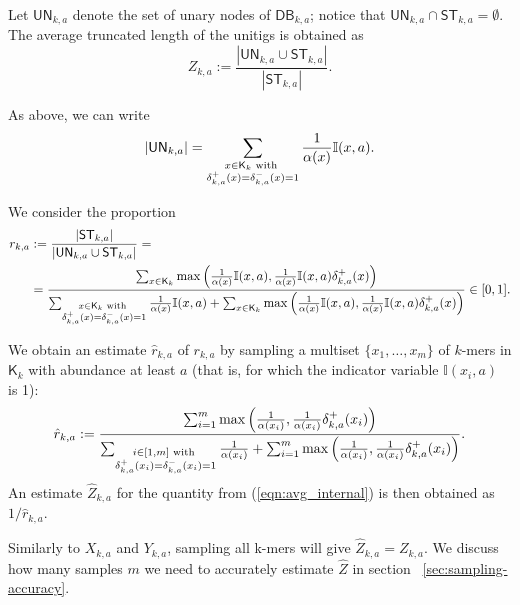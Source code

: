 \documentclass[a4paper,11pt]{article}
\newcommand{\alex}[1]{{\color{blue}{#1}}}
\newcommand{\DB}{\mathsf{DB}_{k,a}}
\newcommand{\ST}{\mathsf{ST}_{k,a}}
\newcommand{\UN}{\mathsf{UN}_{k,a}}
\newcommand{\dplus}{\delta^+_{k,a}}
\newcommand{\dminus}{\delta^-_{k,a}}
\newcommand{\K}{\mathsf{K}}
\newcommand{\abu}{\alpha}
\begin{document}
Let $\UN$ denote the set of unary nodes of $\DB$; notice that $\UN \cap \ST = \emptyset$. The average truncated length of the unitigs is obtained as 
\begin{equation}
 Z_{k,a} := \frac{|\UN \cup \ST|}{|\ST|}.
\label{eqn:avg_internal}
\end{equation}

As above, we can write
\[|\UN| = \sum_{\begin{subarray}{c} x \in \K_k \text{ with } \\ \dplus(x) = \dminus(x) = 1 \end{subarray}} \frac{1}{\abu(x)}\mathbb{I}(x,a).\]

We consider the proportion
\begin{align*}
r_{k,a} & := \frac{|\ST|}{|\UN \cup \ST|} = \\ 
& = \frac{\sum_{x \in \K_k} \max\left(\frac{1}{\abu(x)}\mathbb{I}(x,a),\frac{1}{\abu(x)}\mathbb{I}(x,a)\dplus(x)\right)}{\sum_{\begin{subarray}{c} x \in \K_k \text{ with } \\ \dplus(x) = \dminus(x) = 1 \end{subarray}} \frac{1}{\abu(x)}\mathbb{I}(x,a) + \sum_{x \in \K_k} \max\left(\frac{1}{\abu(x)}\mathbb{I}(x,a),\frac{1}{\abu(x)}\mathbb{I}(x,a)\dplus(x)\right)}\in [0,1].\\
\end{align*}

We obtain an estimate $\hat{r}_{k,a}$ of $r_{k,a}$ by sampling a multiset $\{x_1,\dots,x_m\}$ of $k$-mers in $\K_k$ with abundance at least $a$ (that is, for which the indicator variable $\mathbb{I}(x_i,a)$ is 1):
\[\hat{r}_{k,a} := \frac{\sum_{i=1}^{m} \max\left(\frac{1}{\abu(x_i)},\frac{1}{\abu(x_i)}\dplus(x_i)\right)}{\sum_{\begin{subarray}{c} i \in [1,m] \text{ with } \\ \dplus(x_i) = \dminus(x_i) = 1 \end{subarray}} \frac{1}{\abu(x_i)} + \sum_{i=1}^{m} \max\left(\frac{1}{\abu(x_i)},\frac{1}{\abu(x_i)}\dplus(x_i)\right)}.\]
An estimate $\hat{Z}_{k,a}$ for the quantity from (\ref{eqn:avg_internal}) is then obtained as $1/\hat{r}_{k,a}$. 

Similarly to $X_{k,a}$ and $Y_{k,a}$, sampling all k-mers will give $\hat{Z}_{k,a} = Z_{k,a}$. We discuss how many samples $m$ we need to accurately estimate $\hat{Z}$ in section ~\ref{sec:sampling-accuracy}.
\alex{say we can implement this for all abundances.}
\end{document}
